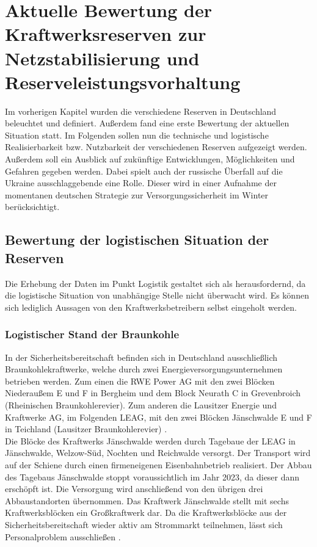 \section{Aktuelle Bewertung der Kraftwerksreserven zur Netzstabilisierung und Reserveleistungsvorhaltung}

	Im vorherigen Kapitel wurden die verschiedene Reserven in Deutschland beleuchtet und definiert. 
	Außerdem fand eine erste Bewertung der aktuellen Situation statt. Im Folgenden sollen nun die technische und logistische Realisierbarkeit bzw. Nutzbarkeit der verschiedenen Reserven aufgezeigt werden. 
	Außerdem soll ein Ausblick auf zukünftige Entwicklungen, Möglichkeiten und Gefahren gegeben werden. 
	Dabei spielt auch der russische Überfall auf die Ukraine ausschlaggebende eine Rolle. 
	Dieser wird in einer Aufnahme der momentanen deutschen Strategie zur Versorgungssicherheit im Winter berücksichtigt.

	\subsection{Bewertung der logistischen Situation der Reserven}
	
		Die Erhebung der Daten im Punkt Logistik gestaltet sich als herausfordernd, da die logistische Situation von unabhängige Stelle nicht überwacht wird. 
		Es können sich lediglich Aussagen von den Kraftwerksbetreibern selbst eingeholt werden.
	
		\subsubsection{Logistischer Stand der Braunkohle} \label{sect: Braunkohle}
		
			In der Sicherheitsbereitschaft befinden sich in Deutschland ausschließlich Braunkohlekraftwerke, welche durch zwei Energieversorgungsunternehmen betrieben werden.
			Zum einen die RWE Power AG mit den zwei Blöcken Niederaußem E und F in Bergheim und dem Block Neurath C in Grevenbroich (Rheinischen Braunkohlerevier).
			Zum anderen die Lausitzer Energie und Kraftwerke AG, im Folgenden LEAG, mit den zwei Blöcken Jänschwalde E und F in Teichland (Lausitzer Braunkohlerevier) \cite{Excel_Kraftwerksliste}. \\
	
			Die Blöcke des Kraftwerks Jänschwalde werden durch Tagebaue der LEAG in Jänschwalde, Welzow-Süd, Nochten und Reichwalde versorgt. 
			Der Transport wird auf der Schiene durch einen firmeneigenen Eisenbahnbetrieb realisiert. 
			Der Abbau des Tagebaus Jänschwalde stoppt voraussichtlich im Jahr 2023, da dieser dann erschöpft ist. 
			Die Versorgung wird anschließend von den übrigen drei Abbaustandorten übernommen.
			Das Kraftwerk Jänschwalde stellt mit sechs Kraftwerksblöcken ein Großkraftwerk dar.
			Da die Kraftwerksblöcke aus der Sicherheitsbereitschaft wieder aktiv am Strommarkt teilnehmen, lässt sich Personalproblem ausschließen \cite{LEAG_Braunkohleversorgung}. \\
			
